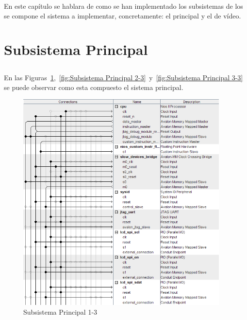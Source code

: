 \documentclass[a4paper,12pt,titlepage,final]{book}
\begin{document}
\subsection*{}
\subsubsection*{}

\paragraph{}
En este capítulo se hablara de como se han implementado los subsistemas de los se compone el sistema a implementar, concretamente: el principal y el de vídeo. 

\section{Subsistema Principal}
\subsection*{}
\subsubsection*{}

\paragraph{}
En las Figuras~\ref{fig:Subsistema Principal 1-3},~\ref{fig:Subsistema Principal 2-3}~y~\ref{fig:Subsistema Principal 3-3} se puede observar como esta compuesto el sistema principal.

\begin{figure}[p]
\centering
\includegraphics[height=0.95\textheight,
width=0.95\textwidth]{./figuras/SistemaPrincipal/sistemaprincipalpagina1.png}
\caption{Subsistema Principal 1-3}
\label{fig:Subsistema Principal 1-3}
\end{figure}
\end{document}
